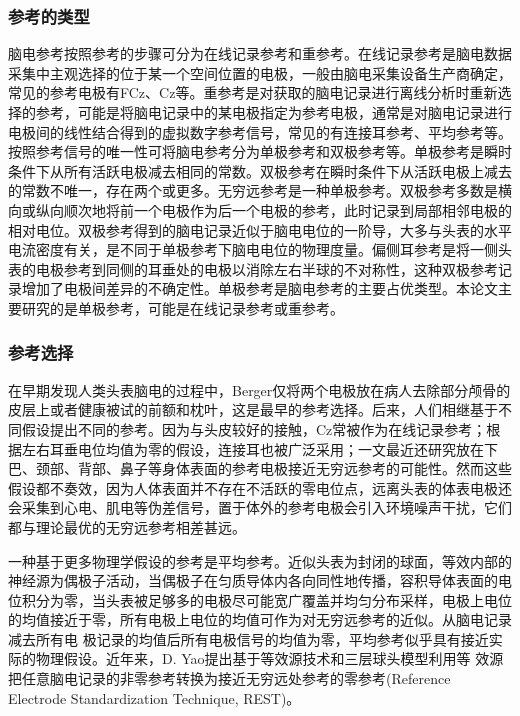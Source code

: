 \subsubsection{参考的类型}
脑电参考按照参考的步骤可分为在线记录参考和重参考。在线记录参考是脑电数据采集中主观选择的位于某一个空间位置的电极，一般由脑电采集设备生产商确定，常见的参考电极有FCz、Cz等。重参考是对获取的脑电记录进行离线分析时重新选择的参考，可能是将脑电记录中的某电极指定为参考电极，通常是对脑电记录进行电极间的线性结合得到的虚拟数字参考信号，常见的有连接耳参考、平均参考等。按照参考信号的唯一性可将脑电参考分为单极参考和双极参考等。单极参考是瞬时条件下从所有活跃电极减去相同的常数。双极参考在瞬时条件下从活跃电极上减去的常数不唯一，存在两个或更多。无穷远参考是一种单极参考。双极参考多数是横向或纵向顺次地将前一个电极作为后一个电极的参考，此时记录到局部相邻电极的相对电位。双极参考得到的脑电记录近似于脑电电位的一阶导，大多与头表的水平电流密度有关，是不同于单极参考下脑电电位的物理度量。偏侧耳参考是将一侧头表的电极参考到同侧的耳垂处的电极以消除左右半球的不对称性，这种双极参考记录增加了电极间差异的不确定性。单极参考是脑电参考的主要占优类型。本论文主要研究的是单极参考，可能是在线记录参考或重参考。

\subsubsection{参考选择}
在早期发现人类头表脑电的过程中，Berger仅将两个电极放在病人去除部分颅骨的皮层上或者健康被试的前额和枕叶，这是最早的参考选择。后来，人们相继基于不同假设提出不同的参考。因为与头皮较好的接触，Cz常被作为在线记录参考；根据左右耳垂电位均值为零的假设，连接耳也被广泛采用；\cite{kulaichev_optimal_2016}一文最近还研究放在下巴、颈部、背部、鼻子等身体表面的参考电极接近无穷远参考的可能性。然而这些假设都不奏效，因为人体表面并不存在不活跃的零电位点，远离头表的体表电极还会采集到心电、肌电等伪差信号，置于体外的参考电极会引入环境噪声干扰，它们都与理论最优的无穷远参考相差甚远。

一种基于更多物理学假设的参考是平均参考。近似头表为封闭的球面，等效内部的神经源为偶极子活动，当偶极子在匀质导体内各向同性地传播，容积导体表面的电位积分为零，当头表被足够多的电极尽可能宽广覆盖并均匀分布采样，电极上电位的均值接近于零，所有电极上电位的均值可作为对无穷远参考的近似。从脑电记录减去所有电
极记录的均值后所有电极信号的均值为零，平均参考似乎具有接近实际的物理假设。近年来，D. Yao提出基于等效源技术和三层球头模型利用等
效源把任意脑电记录的非零参考转换为接近无穷远处参考的零参考(Reference Electrode Standardization Technique, REST)。

